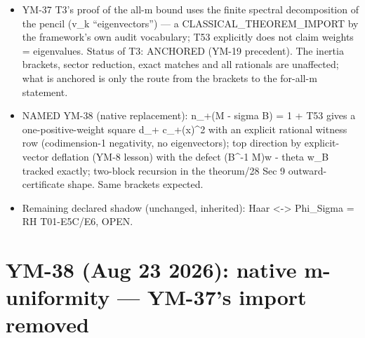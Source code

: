 \begin{itemize}
\tightlist
\item
  YM-37 T3's proof of the all-m bound uses the finite spectral
  decomposition of the pencil (v\_k ``eigenvectors'') --- a CLASSICAL\_THEOREM\_IMPORT
  by the framework's own audit vocabulary; T53 explicitly does not claim
  weights = eigenvalues. Status of T3: ANCHORED (YM-19 precedent). The
  inertia brackets, sector reduction, exact matches and all rationals
  are unaffected; what is anchored is only the route from the brackets
  to the for-all-m statement.
\item
  NAMED YM-38 (native replacement): n\_+(M - sigma B) = 1 + T53 gives a
  one-positive-weight square d\_+ \textbar c\_+(x)\textbar\^{}2 with an explicit rational
  witness row (codimension-1 negativity, no eigenvectors); top direction
  by explicit-vector deflation (YM-8 lesson) with the defect
  \textbar\textbar(B\^{}-1 M)w - theta w\textbar\textbar\_B tracked exactly; two-block recursion in the
  theorum/28 Sec 9 outward-certificate shape. Same brackets expected.
\item
  Remaining declared shadow (unchanged, inherited): Haar \textless-\textgreater{} Phi\_Sigma
  = RH T01-E5C/E6, OPEN.
\end{itemize}

\hypertarget{ym-38-aug-23-2026-native-m-uniformity-ym-37s-import-removed}{%
\section{YM-38 (Aug 23 2026): native m-uniformity --- YM-37's import removed}\label{ym-38-aug-23-2026-native-m-uniformity-ym-37s-import-removed}}

